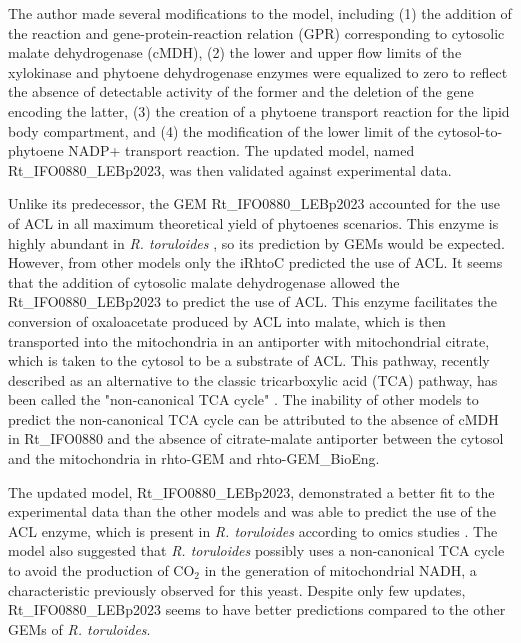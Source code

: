 The author made several modifications to the model, including (1) the addition of the reaction and gene-protein-reaction relation (GPR) corresponding to cytosolic malate dehydrogenase (cMDH), (2) the lower and upper flow limits of the xylokinase and phytoene dehydrogenase enzymes were equalized to zero to reflect the absence of detectable activity of the former and the deletion of the gene encoding the latter, (3) the creation of a phytoene transport reaction for the lipid body compartment, and (4) the modification of the lower limit of the cytosol-to-phytoene NADP+ transport reaction. The updated model, named Rt\_IFO0880\_LEBp2023, was then validated against experimental data. \cite{DeBiaggi2023}

Unlike its predecessor, the GEM Rt\_IFO0880\_LEBp2023 accounted for the use of ACL in all maximum theoretical yield of phytoenes scenarios. This enzyme is highly abundant in \textit{R. toruloides} \cite{Zhu2012}, so its prediction by GEMs would be expected. However, from other models only the iRhtoC predicted the use of ACL. It seems that the addition of cytosolic malate dehydrogenase allowed the Rt\_IFO0880\_LEBp2023 to predict the use of ACL. This enzyme facilitates the conversion of oxaloacetate produced by ACL into malate, which is then transported into the mitochondria in an antiporter with mitochondrial citrate, which is taken to the cytosol to be a substrate of ACL. \cite{DeBiaggi2023} This pathway, recently described as an alternative to the classic tricarboxylic acid (TCA) pathway, has been called the "non-canonical TCA cycle" \cite{Arnold2022}. The inability of other models to predict the non-canonical TCA cycle can be attributed to the absence of cMDH in Rt\_IFO0880 and the absence of citrate-malate antiporter between the cytosol and the mitochondria in rhto-GEM and rhto-GEM\_BioEng. \cite{DeBiaggi2023}

The updated model, Rt\_IFO0880\_LEBp2023, demonstrated a better fit to the experimental data than the other models and was able to predict the use of the ACL enzyme, which is present in \textit{R. toruloides} according to omics studies \cite{Zhu2012}. The model also suggested that \textit{R. toruloides} possibly uses a non-canonical TCA cycle to avoid the production of CO$_2$ in the generation of mitochondrial NADH, a characteristic previously observed for this yeast. Despite only few updates, Rt\_IFO0880\_LEBp2023 seems to have better predictions compared to the other GEMs of \textit{R. toruloides}. \cite{DeBiaggi2023}


